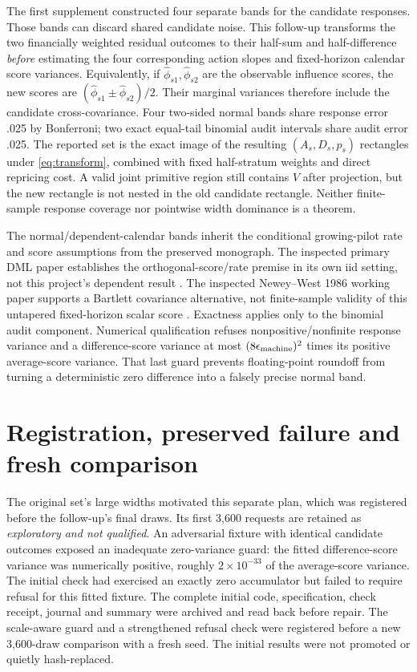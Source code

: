 \documentclass[11pt,a4paper]{article}
\begin{document}
The first supplement constructed four separate bands for the candidate
responses. Those bands can discard shared candidate noise. This follow-up
transforms the two financially weighted residual outcomes to their half-sum
and half-difference \emph{before} estimating the four corresponding action
slopes and fixed-horizon calendar score variances. Equivalently, if
$\widehat\phi_{s1},\widehat\phi_{s2}$ are the observable influence scores,
the new scores are $(\widehat\phi_{s1}\pm\widehat\phi_{s2})/2$. Their marginal
variances therefore include the candidate cross-covariance. Four two-sided
normal bands share response error .025 by Bonferroni; two exact equal-tail
binomial audit intervals share audit error .025. The reported set is the exact
image of the resulting $(A_s,D_s,p_s)$ rectangles under
\eqref{eq:transform}, combined with fixed half-stratum weights and direct
repricing cost. A valid joint primitive region still contains $V$ after
projection, but the new rectangle is not nested in the old candidate
rectangle. Neither finite-sample response coverage nor pointwise width
dominance is a theorem.

The normal/dependent-calendar bands inherit the conditional growing-pilot
rate and score assumptions from the preserved monograph. The inspected
primary DML paper establishes the orthogonal-score/rate premise in its own
iid setting, not this project's dependent result \cite{dml2018}. The
inspected Newey--West 1986 working paper supports a Bartlett covariance
alternative, not finite-sample validity of this untapered fixed-horizon
scalar score \cite{newey1986}. Exactness applies only to the binomial audit
component. Numerical qualification refuses nonpositive/nonfinite response
variance and a difference-score variance at most
$(8\epsilon_{\rm machine})^2$ times its positive average-score variance.
That last guard prevents floating-point roundoff from turning a deterministic
zero difference into a falsely precise normal band.

\section{Registration, preserved failure and fresh comparison}

The original set's large widths motivated this separate plan, which was
registered before the follow-up's final draws. Its first 3,600 requests are
retained as \emph{exploratory and not qualified}. An adversarial fixture with
identical candidate outcomes exposed an inadequate zero-variance guard: the
fitted difference-score variance was numerically positive, roughly
$2\times10^{-33}$ of the average-score variance. The initial check had
exercised an exactly zero accumulator but failed to require refusal for this
fitted fixture. The complete initial code, specification, check receipt,
journal and summary were archived and read back before repair. The scale-aware
guard and a strengthened refusal check were registered before a new 3,600-draw
comparison with a fresh seed. The initial results were not promoted or
quietly hash-replaced.
\end{document}
